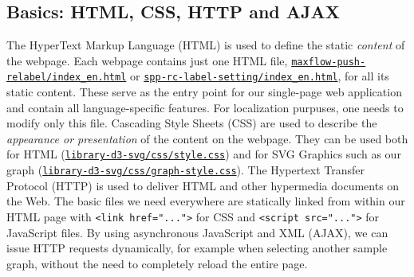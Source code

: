 \subsection{Basics: HTML, CSS, HTTP and AJAX}\label{sec:basic}
The HyperText Markup Language (HTML) is used to define the static \textit{content} of the webpage. Each webpage contains just one HTML file, \texttt{\href{http://www.adrian-haarbach.de/idp-graph-algorithms/implementation/maxflow-push-relabel/index_en.html}{maxflow-push-relabel/index\_en.html}} or \texttt{\href{http://www.adrian-haarbach.de/idp-graph-algorithms/implementation/spp-rc-label-setting/index_en.html}{spp-rc-label-setting/index\_en.html}}, for all its static content. These serve as the entry point for our single-page web application and contain all language-specific features. For localization purpuses, one needs to modify only this file. Cascading Style Sheets (CSS) are used to describe the \textit{appearance or presentation} of the content on the webpage. They can be used both for HTML (\texttt{\href{http://www.adrian-haarbach.de/idp-graph-algorithms/implementation/library-d3-svg/css/style.css}{library-d3-svg/css/style.css}}) and for SVG Graphics such as our graph (\texttt{\href{http://www.adrian-haarbach.de/idp-graph-algorithms/implementation/library-d3-svg/css/graph-style.css}{library-d3-svg/css/graph-style.css}}). The Hypertext Transfer Protocol (HTTP) is used to deliver HTML and other hypermedia documents on the Web. The basic files we need everywhere are statically linked from within our HTML page with \texttt{<link href="...">} for CSS and \texttt{<script src="...">} for JavaScript files. By using asynchronous JavaScript and XML (AJAX), we can issue HTTP requests dynamically, for example when selecting another sample graph, without the need to completely reload the entire page.

